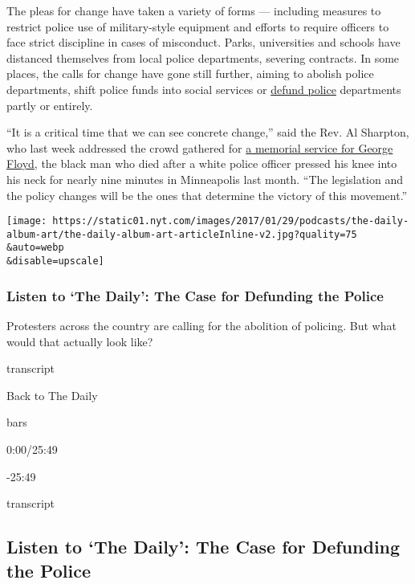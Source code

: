 The pleas for change have taken a variety of forms --- including
measures to restrict police use of military-style equipment and efforts
to require officers to face strict discipline in cases of misconduct.
Parks, universities and schools have distanced themselves from local
police departments, severing contracts. In some places, the calls for
change have gone still further, aiming to abolish police departments,
shift police funds into social services or
\href{https://www.nytimes.com/2020/06/09/us/ca-defund-police.html}{defund
police} departments partly or entirely.

``It is a critical time that we can see concrete change,'' said the Rev.
Al Sharpton, who last week addressed the crowd gathered for
\href{https://www.nytimes.com/2020/06/08/us/george-floyd-viewing-funeral-houston-unrest.html}{a
memorial service for George Floyd}, the black man who died after a white
police officer pressed his knee into his neck for nearly nine minutes in
Minneapolis last month. ``The legislation and the policy changes will be
the ones that determine the victory of this movement.''

\texttt{[image: https://static01.nyt.com/images/2017/01/29/podcasts/the-daily-album-art/the-daily-album-art-articleInline-v2.jpg?quality=75\\\&auto=webp\\\&disable=upscale]}

\hypertarget{listen-to-the-daily-the-case-for-defunding-the-police}{%
\subsubsection{Listen to `The Daily': The Case for Defunding the
Police}\label{listen-to-the-daily-the-case-for-defunding-the-police}}

Protesters across the country are calling for the abolition of policing.
But what would that actually look like?

transcript

Back to The Daily

bars

0:00/25:49

-25:49

transcript

\hypertarget{listen-to-the-daily-the-case-for-defunding-the-police-1}{%
\subsection{Listen to `The Daily': The Case for Defunding the
Police}\label{listen-to-the-daily-the-case-for-defunding-the-police-1}}

